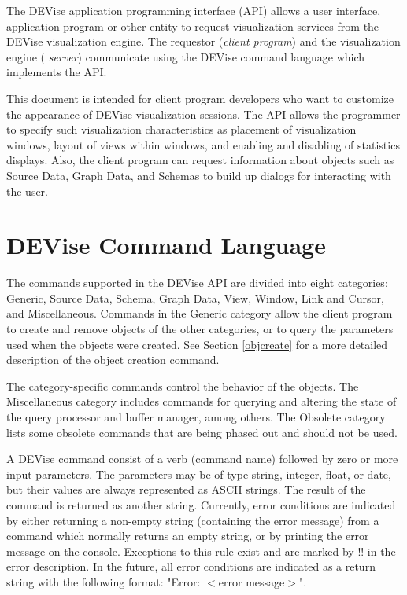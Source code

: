 The DEVise application programming interface (API) allows a user
interface, application program or other entity to request
visualization services from the DEVise visualization engine. The
requestor ({\em client program}) and the visualization engine ({\em
server}) communicate using the DEVise command language which
implements the API.

This document is intended for client program developers who want to
customize the appearance of DEVise visualization sessions. The API
allows the programmer to specify such visualization characteristics as
placement of visualization windows, layout of views within windows,
and enabling and disabling of statistics displays. Also, the client
program can request information about objects such as Source Data,
Graph Data, and Schemas to build up dialogs for interacting with the
user.

\section{DEVise Command Language}

The commands supported in the DEVise API are divided into eight
categories: Generic, Source Data, Schema, Graph Data, View, Window,
Link and Cursor, and Miscellaneous. Commands in the Generic category
allow the client program to create and remove objects of the other
categories, or to query the parameters used when the objects were
created. See Section \ref{objcreate} for a more detailed description
of the object creation command.

The category-specific commands control the behavior of the
objects. The Miscellaneous category includes commands for querying and
altering the state of the query processor and buffer manager, among
others. The Obsolete category lists some obsolete commands that are
being phased out and should not be used.

A DEVise command consist of a verb (command name) followed by zero or
more input parameters. The parameters may be of type string, integer,
float, or date, but their values are always represented as ASCII
strings. The result of the command is returned as another
string. Currently, error conditions are indicated by either returning
a non-empty string (containing the error message) from a command which
normally returns an empty string, or by printing the error message on
the console. Exceptions to this rule exist and are marked by !! in the
error description. In the future, all error conditions are indicated
as a return string with the following format: "Error: $<$error
message$>$".

